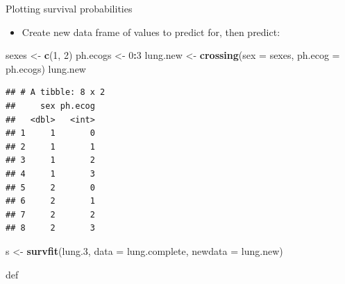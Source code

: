 \documentclass[ignorenonframetext,]{beamer}
\newenvironment{Shaded}{\begin{snugshade}}{\end{snugshade}}
\newcommand{\DataTypeTok}[1]{\textcolor[rgb]{0.13,0.29,0.53}{#1}}
\newcommand{\DecValTok}[1]{\textcolor[rgb]{0.00,0.00,0.81}{#1}}
\newcommand{\FloatTok}[1]{\textcolor[rgb]{0.00,0.00,0.81}{#1}}
\newcommand{\KeywordTok}[1]{\textcolor[rgb]{0.13,0.29,0.53}{\textbf{#1}}}
\newcommand{\NormalTok}[1]{#1}
\newcommand{\OperatorTok}[1]{\textcolor[rgb]{0.81,0.36,0.00}{\textbf{#1}}}
\newcommand{\StringTok}[1]{\textcolor[rgb]{0.31,0.60,0.02}{#1}}
\providecommand{\tightlist}{%
  \setlength{\itemsep}{0pt}\setlength{\parskip}{0pt}}
\begin{document}
\begin{frame}[fragile]{Plotting survival probabilities}
\protect\hypertarget{plotting-survival-probabilities-1}{}

\begin{itemize}
\tightlist
\item
  Create new data frame of values to predict for, then predict:
\end{itemize}

\begin{Shaded}
\begin{Highlighting}[]
\NormalTok{sexes <-}\StringTok{ }\KeywordTok{c}\NormalTok{(}\DecValTok{1}\NormalTok{, }\DecValTok{2}\NormalTok{)}
\NormalTok{ph.ecogs <-}\StringTok{ }\DecValTok{0}\OperatorTok{:}\DecValTok{3}
\NormalTok{lung.new <-}\StringTok{ }\KeywordTok{crossing}\NormalTok{(}\DataTypeTok{sex =}\NormalTok{ sexes, }\DataTypeTok{ph.ecog =}\NormalTok{ ph.ecogs)}
\NormalTok{lung.new}
\end{Highlighting}
\end{Shaded}

\begin{verbatim}
## # A tibble: 8 x 2
##     sex ph.ecog
##   <dbl>   <int>
## 1     1       0
## 2     1       1
## 3     1       2
## 4     1       3
## 5     2       0
## 6     2       1
## 7     2       2
## 8     2       3
\end{verbatim}

\begin{Shaded}
\begin{Highlighting}[]
\NormalTok{s <-}\StringTok{ }\KeywordTok{survfit}\NormalTok{(lung}\FloatTok{.3}\NormalTok{, }\DataTypeTok{data =}\NormalTok{ lung.complete, }\DataTypeTok{newdata =}\NormalTok{ lung.new)}
\end{Highlighting}
\end{Shaded}

def

\end{frame}
\end{document}
